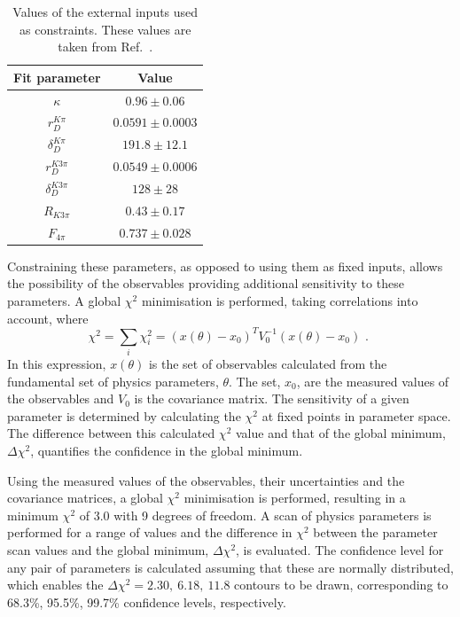 \begin{table}
\centering
\begin{tabular}{cc}
Fit parameter & Value \\
\hline
$\kappa$ & $0.96 \pm 0.06$ \\
$r_D^{K\pi}$ & $0.0591 \pm 0.0003$ \\
$\delta_D^{K\pi}$ & $191.8 \pm 12.1$ \\
$r_D^{K3\pi}$ & $0.0549 \pm 0.0006$ \\
$\delta_D^{K3\pi}$ & $128 \pm 28$ \\
$R_{K3\pi}$ & $0.43 \pm 0.17$ \\
$F_{4\pi}$ & $0.737 \pm 0.028$
\end{tabular}
\caption{Values of the external inputs used as constraints. These values are taken from Ref.~\cite{HFAG,charmk3pi,charmk3pi_errata,LHCb-PAPER-2015-057,charm4pi}.}
\label{inputparameters}
\end{table}

Constraining these parameters, as opposed to using them as fixed inputs, allows the possibility of the \CP observables providing additional sensitivity to these parameters. A global $\chi^2$ minimisation is performed, taking correlations into account, where
\begin{equation}
\chi^2 = \sum_i \chi^2_i = (x(\theta) - x_0)^TV_0^{-1}(x(\theta)-x_0) \text{ . }
\end{equation}
In this expression, $x(\theta)$ is the set of observables calculated from the fundamental set of physics parameters, $\theta$. The set, $x_0$, are the measured values of the observables and $V_0$ is the covariance matrix. The sensitivity of a given parameter is determined by calculating the $\chi^2$ at fixed points in parameter space. The difference between this calculated $\chi^2$ value and that of the global minimum, $\Delta\chi^2$, quantifies the confidence in the global minimum. 

Using the measured values of the \CP observables, their uncertainties and the covariance matrices, a global $\chi^2$ minimisation is performed, resulting in a minimum $\chi^2$ of 3.0 with 9 degrees of freedom. A scan of physics parameters is performed for a range of values and the difference in $\chi^2$ between the parameter scan values and the global minimum, $\Delta\chi^2$, is evaluated. The confidence level for any pair of parameters is calculated assuming that these are normally distributed, which enables the $\Delta \chi^2 = 2.30,\ 6.18,\ 11.8$ contours to be drawn, corresponding to 68.3\%, 95.5\%, 99.7\% confidence levels, respectively. 

